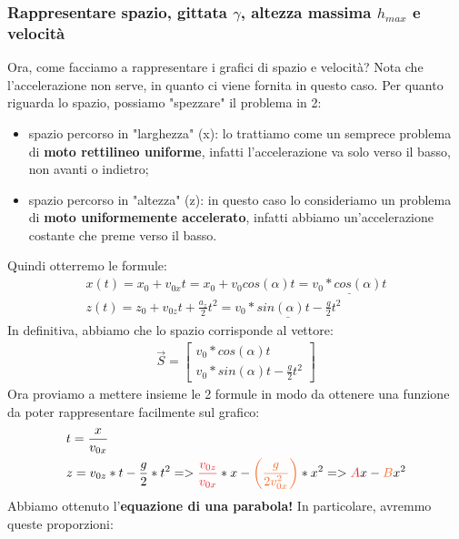 			\subsubsection{Rappresentare spazio, gittata $\gamma$, altezza massima $h_{max}$ e velocità}
				Ora, come facciamo a rappresentare i grafici di spazio e velocità? Nota che l'accelerazione non serve, in quanto ci viene fornita in questo caso. Per quanto riguarda lo spazio, possiamo "spezzare" il problema in 2:
				\begin{itemize}
					\item spazio percorso in "larghezza" (x): lo trattiamo come un semprece problema di \textbf{moto rettilineo uniforme}, infatti l'accelerazione va solo verso il basso, non avanti o indietro;
					\item spazio percorso in "altezza" (z): in questo caso lo consideriamo un problema di \textbf{moto uniformemente accelerato}, infatti abbiamo un'accelerazione costante che preme verso il basso.
				\end{itemize}
				Quindi otterremo le formule:
				\begin{align*}
					x(t) = x_0 + v_{0x}t = x_0 + v_0 cos(\alpha) t = \underline{v_0* cos(\alpha) t}\\
					z(t) = z_0 +v_{0z}t +\frac{a_z}{2}t^2 = \underline{v_0*sin(\alpha) t - \frac{g}{2} t^2}
				\end{align*}
				In definitiva, abbiamo che lo spazio corrisponde al vettore:
				\begin{align*}
					\vec{S}=
					\begin{bmatrix}
						v_0*cos(\alpha)t\\
						v_0*sin(\alpha)t-\frac{g}{2}t^2
					\end{bmatrix}
				\end{align*}
				Ora proviamo a mettere insieme le 2 formule in modo da ottenere una funzione da poter rappresentare facilmente sul grafico:
				\begin{align*}
					&t = \frac{x}{v_{0x}}\\
					&z = v_{0z}*t - \frac{g}{2}*t^2 => \textcolor{Red}{\frac{v_{0z}}{v_{0x}}} * x - \textcolor{Orange}{\bigg(\frac{g}{2v_{0x}^2}\bigg)}*x^2 => \textcolor{Red}{A}x - \textcolor{Orange}{B}x^2
				\end{align*}
				Abbiamo ottenuto l'\textbf{equazione di una parabola!} In particolare, avremmo queste proporzioni:

